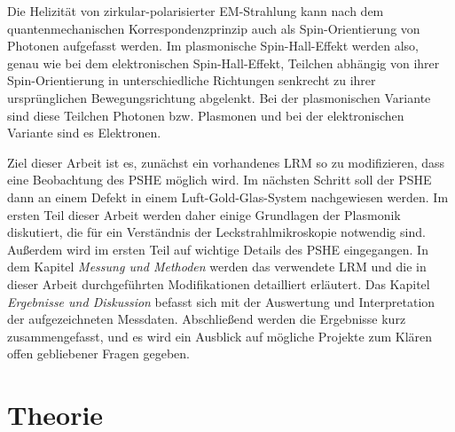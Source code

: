 \documentclass[titlepage,  ngerman]{article}
\begin{document}
	Die Helizität von zirkular-polarisierter EM-Strahlung kann nach dem quantenmechanischen Korrespondenzprinzip auch als Spin-Orientierung von Photonen aufgefasst werden.	Im plasmonische Spin-Hall-Effekt werden also, genau wie bei dem elektronischen Spin-Hall-Effekt, Teilchen abhängig von ihrer Spin-Orientierung in unterschiedliche Richtungen senkrecht zu ihrer ursprünglichen Bewegungsrichtung abgelenkt. Bei der plasmonischen Variante sind diese Teilchen Photonen bzw. Plasmonen und bei der elektronischen Variante sind es Elektronen. \cite{Inoue.2005}
	
	Ziel dieser Arbeit ist es, zunächst ein vorhandenes LRM so zu modifizieren, dass eine Beobachtung des PSHE möglich wird. Im nächsten Schritt soll der PSHE dann an einem Defekt in einem Luft-Gold-Glas-System nachgewiesen werden. Im ersten Teil dieser Arbeit werden daher einige Grundlagen der Plasmonik diskutiert, die für ein Verständnis der Leckstrahlmikroskopie notwendig sind. Außerdem wird im ersten Teil auf wichtige Details des PSHE eingegangen. In dem Kapitel \textit{Messung und Methoden} werden das verwendete LRM und die in dieser Arbeit durchgeführten Modifikationen detailliert erläutert. Das Kapitel \textit{Ergebnisse und Diskussion} befasst sich mit der Auswertung und Interpretation der aufgezeichneten Messdaten. Abschließend werden die Ergebnisse kurz zusammengefasst, und es wird ein Ausblick auf mögliche Projekte zum Klären offen gebliebener Fragen gegeben.
	
	\newpage	
	\section{Theorie}
\end{document}
